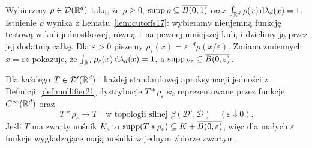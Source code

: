 \begin{definicja}
\label{def:mollifier21}
Wybierzmy $\rho\in\mathcal D(\mathbb R^d)$ taką, że
$\rho\ge0$, $\operatorname{supp}\rho\subseteq\overline{B(0,1)}$
oraz $\int_{\mathbb R^d}\rho(x)\,\mathrm d\lambda_d(x)=1$.
Istnienie $\rho$ wynika z Lematu~\ref{lem:cutoffs17}:
wybieramy nieujemną funkcję testową w kuli jednostkowej,
równą $1$ na pewnej mniejszej kuli, i dzielimy ją przez
jej dodatnią całkę. Dla $\varepsilon>0$ piszemy
$\rho_\varepsilon(x)=\varepsilon^{-d}\rho(x/\varepsilon)$.
Zmiana zmiennych $x=\varepsilon z$ pokazuje, że
$\int_{\mathbb R^d}\rho_\varepsilon(x)\,\mathrm d\lambda_d(x)=1$,
a $\operatorname{supp}\rho_\varepsilon\subseteq\overline{B(0,\varepsilon)}$.
\end{definicja}

\begin{twierdzenie}
\label{thm:strong-mollification21}
Dla każdego $T\in\mathcal D'(\mathbb R^d)$ i każdej
standardowej aproksymacji jedności z
Definicji~\ref{def:mollifier21} dystrybucje
$T*\rho_\varepsilon$ są reprezentowane przez funkcje
$C^\infty(\mathbb R^d)$ oraz
\[
 T*\rho_\varepsilon\longrightarrow T
 \quad\text{w topologii silnej }\beta(\mathcal D',\mathcal D)
 \quad(\varepsilon\downarrow0).
\]
Jeśli $T$ ma zwarty nośnik $K$, to
$\operatorname{supp}(T*\rho_\varepsilon)\subseteq K+
\overline{B(0,\varepsilon)}$, więc dla małych
$\varepsilon$ funkcje wygładzające mają nośniki
w jednym zbiorze zwartym.
\end{twierdzenie}
